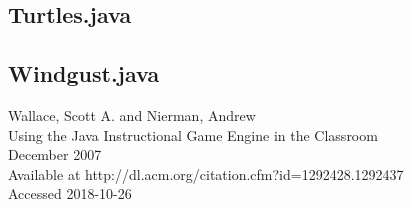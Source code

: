 \documentclass[12pt]{article}
\begin{document}
\subsection{Turtles.java}

\subsection{Windgust.java}

\begin{thebibliography}{0}
    Wallace, Scott A. and Nierman, Andrew\\
    Using the Java Instructional Game Engine in the Classroom\\
    December 2007\\
    Available at http://dl.acm.org/citation.cfm?id=1292428.1292437\\
    Accessed 2018-10-26
\end{thebibliography}
\end{document}
